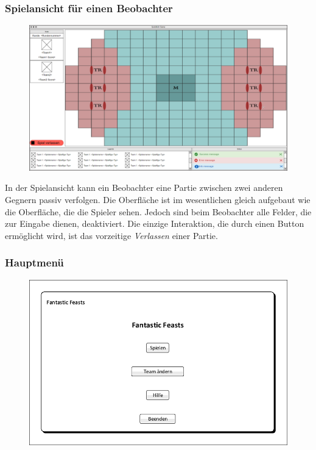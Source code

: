 \subsubsection{Spielansicht für einen Beobachter}

\begin{figure}[H]
    \centering
    \includegraphics[width=\textwidth]{../Meilenstein03/images/InGameObserver.PNG}
\end{figure}

    In der Spielansicht kann ein Beobachter eine Partie zwischen zwei anderen Gegnern passiv verfolgen. Die Oberfläche ist im wesentlichen gleich aufgebaut wie die Oberfläche, die die Spieler sehen. Jedoch sind beim Beobachter alle Felder, die zur Eingabe dienen, deaktiviert. Die einzige Interaktion, die durch einen Button ermöglicht wird, ist das vorzeitige \textit{Verlassen} einer Partie.

    \subsubsection{Hauptmenü}
\begin{figure}[H]
    \centering
    \includegraphics[scale=0.8]{../Meilenstein03/images/Startbildschirm.pdf}
\end{figure}

